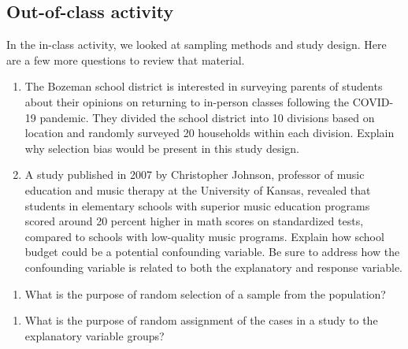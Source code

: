 \documentclass[
]{report}
\providecommand{\tightlist}{%
  \setlength{\itemsep}{0pt}\setlength{\parskip}{0pt}}
\begin{document}
\newpage

\hypertarget{out-of-class-activity-1}{%
\subsection{Out-of-class activity}\label{out-of-class-activity-1}}

In the in-class activity, we looked at sampling methods and study design. Here are a few more questions to review that material.

\begin{enumerate}
\def\labelenumi{\arabic{enumi}.}
\item
  The Bozeman school district is interested in surveying parents of students about their opinions on returning to in-person classes following the COVID-19 pandemic. They divided the school district into 10 divisions based on location and randomly surveyed 20 households within each division. Explain why selection bias would be present in this study design.
  \vspace{1in}
\item
  A study published in 2007 by Christopher Johnson, professor of music education and music therapy at the University of Kansas, revealed that students in elementary schools with superior music education programs scored around 20 percent higher in math scores on standardized tests, compared to schools with low-quality music programs. Explain how school budget could be a potential confounding variable. Be sure to address how the confounding variable is related to both the explanatory and response variable.
\end{enumerate}

\vspace{1in}

\begin{enumerate}
\def\labelenumi{\arabic{enumi}.}
\setcounter{enumi}{2}
\tightlist
\item
  What is the purpose of random selection of a sample from the population?
\end{enumerate}

\vspace{0.8in}

\begin{enumerate}
\def\labelenumi{\arabic{enumi}.}
\setcounter{enumi}{3}
\tightlist
\item
  What is the purpose of random assignment of the cases in a study to the explanatory variable groups?
\end{enumerate}
\end{document}
